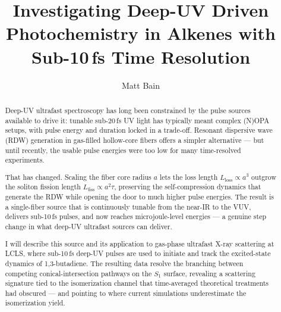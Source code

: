 \title{Investigating Deep-UV Driven Photochemistry in Alkenes with Sub-10\,fs Time Resolution}
\author{Matt Bain}
\date{}


\maketitle

\begin{abstract}
Deep-UV ultrafast spectroscopy has long been constrained by the pulse sources available to drive it: tunable sub-20\,fs UV light has typically meant complex (N)OPA setups, with pulse energy and duration locked in a trade-off. Resonant dispersive wave (RDW) generation in gas-filled hollow-core fibers offers a simpler alternative --- but until recently, the usable pulse energies were too low for many time-resolved experiments.

That has changed. Scaling the fiber core radius $a$ lets the loss length $L_\text{loss} \propto a^3$ outgrow the soliton fission length $L_\text{fiss} \propto a^2\tau$, preserving the self-compression dynamics that generate the RDW while opening the door to much higher pulse energies. The result is a single-fiber source that is continuously tunable from the near-IR to the VUV, delivers sub-10\,fs pulses, and now reaches microjoule-level energies --- a genuine step change in what deep-UV ultrafast sources can deliver.

I will describe this source and its application to gas-phase ultrafast X-ray scattering at LCLS, where sub-10\,fs deep-UV pulses are used to initiate and track the excited-state dynamics of 1,3-butadiene. The resulting data resolve the branching between competing conical-intersection pathways on the $S_1$ surface, revealing a scattering signature tied to the isomerization channel that time-averaged theoretical treatments had obscured --- and pointing to where current simulations underestimate the isomerization yield.
\end{abstract}


